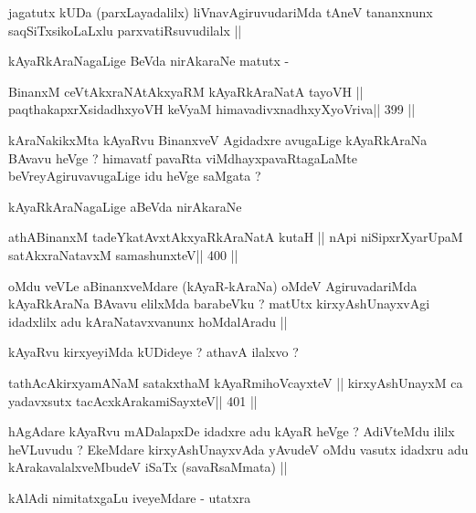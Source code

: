 \begin{artha}
jagatutx kUDa (parxLayadalilx) liVnavAgiruvudariMda tAneV tananxnunx saqSiTxsikoLaLxlu parxvatiRsuvudilalx ||
\end{artha}

\begin{artha}
kAyaRkAraNagaLige BeVda nirAkaraNe matutx - 
\end{artha}

\begin{shl}
BinanxM ceVtAkxraNAtAkxyaRM kAyaRkAraNatA tayoVH ||
paqthakapxrXsidadhxyoVH keVyaM himavadivxnadhxyXyoVriva|| 399 ||
\end{shl}

\begin{artha}
kAraNakikxMta kAyaRvu BinanxveV Agidadxre avugaLige kAyaRkAraNa BAvavu heVge ? himavatf pavaRta viMdhayxpavaRtagaLaMte beVreyAgiruvavugaLige idu heVge saMgata ?
\end{artha}

\begin{artha}
kAyaRkAraNagaLige aBeVda nirAkaraNe
\end{artha}

\begin{shl}
athABinanxM tadeYkatAvxtAkxyaRkAraNatA kutaH ||
nApi niSipxrXyarUpaM satAkxraNatavxM samashunxteV\hfill || 400 ||
\end{shl}

\begin{artha}
oMdu veVLe aBinanxveMdare (kAyaR-kAraNa) oMdeV AgiruvadariMda kAyaRkAraNa BAvavu elilxMda barabeVku ? matUtx kirxyAshUnayxvAgi idadxlilx adu kAraNatavxvanunx hoMdalAradu ||
\end{artha}

\begin{artha}
kAyaRvu kirxyeyiMda kUDideye ? athavA ilalxvo ?
\end{artha}

\begin{shl}
tathAcAkirxyamANaM satakxthaM kAyaRmihoVcayxteV ||
kirxyAshUnayxM ca yadavxsutx tacAcxkArakamiSayxteV\hfill || 401 ||
\end{shl}

\begin{artha}
hAgAdare kAyaRvu mADalapxDe idadxre adu kAyaR heVge ? AdiVteMdu ililx heVLuvudu ? EkeMdare kirxyAshUnayxvAda yAvudeV oMdu vasutx idadxru adu kArakavalalxveMbudeV iSaTx (savaRsaMmata) ||
\end{artha}

\begin{artha}
kAlAdi nimitatxgaLu iveyeMdare - utatxra
\end{artha}

